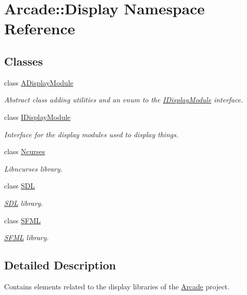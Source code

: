 \hypertarget{namespaceArcade_1_1Display}{}\section{Arcade\+::Display Namespace Reference}
\label{namespaceArcade_1_1Display}
\subsection*{Classes}
\begin{DoxyCompactItemize}
\item 
class \mbox{\hyperlink{classArcade_1_1Display_1_1ADisplayModule}{A\+Display\+Module}}
\begin{DoxyCompactList}\small\item\em Abstract class adding utilities and an enum to the \mbox{\hyperlink{classArcade_1_1Display_1_1IDisplayModule}{I\+Display\+Module}} interface. \end{DoxyCompactList}\item 
class \mbox{\hyperlink{classArcade_1_1Display_1_1IDisplayModule}{I\+Display\+Module}}
\begin{DoxyCompactList}\small\item\em Interface for the display modules used to display things. \end{DoxyCompactList}\item 
class \mbox{\hyperlink{classArcade_1_1Display_1_1Ncurses}{Ncurses}}
\begin{DoxyCompactList}\small\item\em Libncurses library. \end{DoxyCompactList}\item 
class \mbox{\hyperlink{classArcade_1_1Display_1_1SDL}{S\+DL}}
\begin{DoxyCompactList}\small\item\em \mbox{\hyperlink{classArcade_1_1Display_1_1SDL}{S\+DL}} library. \end{DoxyCompactList}\item 
class \mbox{\hyperlink{classArcade_1_1Display_1_1SFML}{S\+F\+ML}}
\begin{DoxyCompactList}\small\item\em \mbox{\hyperlink{classArcade_1_1Display_1_1SFML}{S\+F\+ML}} library. \end{DoxyCompactList}\end{DoxyCompactItemize}


\subsection{Detailed Description}
Contains elements related to the display libraries of the \mbox{\hyperlink{namespaceArcade}{Arcade}} project. 